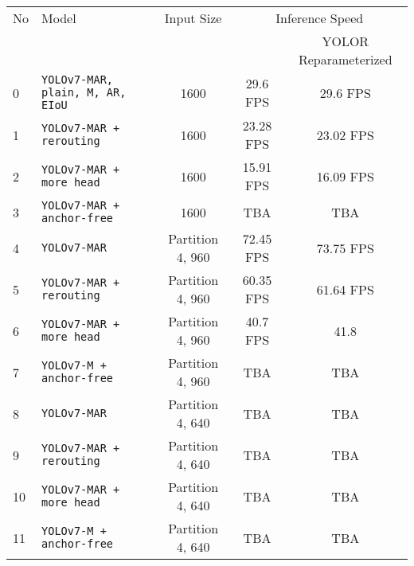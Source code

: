 \begin{tabular}{ l l c c c}
  \toprule[1.5pt]
  No & Model                                       &   Input Size         &\multicolumn{2}{c}{Inference Speed}          \\
     &                                             &                      &                     & \footnotesize{YOLOR Reparameterized} \\
  \midrule
  0  & \texttt{YOLOv7-MAR, plain, M, AR, EIoU}     &      1600            & 29.6 FPS            & 29.6 FPS   \\
  1  & \texttt{YOLOv7-MAR + rerouting}             &      1600            & 23.28 FPS           & 23.02 FPS   \\
  2  & \texttt{YOLOv7-MAR + more head}             &      1600            & 15.91 FPS           & 16.09 FPS   \\
  3  & \texttt{YOLOv7-MAR + anchor-free}           &      1600            & TBA                 & TBA   \\
  \midrule
  4  & \texttt{YOLOv7-MAR}                         &  Partition 4, 960    & 72.45 FPS           & 73.75 FPS  \\
  5  & \texttt{YOLOv7-MAR + rerouting}             &  Partition 4, 960    & 60.35 FPS           & 61.64 FPS  \\
  6  & \texttt{YOLOv7-MAR + more head}             &  Partition 4, 960    & 40.7 FPS            & 41.8   \\
  7  & \texttt{YOLOv7-M + anchor-free}             &  Partition 4, 960    & TBA                 & TBA   \\
  \midrule
  8  & \texttt{YOLOv7-MAR}                         &  Partition 4, 640    & TBA                 & TBA   \\
  9  & \texttt{YOLOv7-MAR + rerouting}             &  Partition 4, 640    & TBA                 & TBA   \\
  10 & \texttt{YOLOv7-MAR + more head}             &  Partition 4, 640    & TBA                 & TBA   \\
  11 & \texttt{YOLOv7-M + anchor-free}             &  Partition 4, 640    & TBA                 & TBA   \\
  \bottomrule[1.5pt]
\end{tabular}